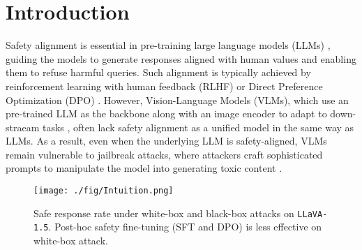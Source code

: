 \vspace{-0.5em}
\section{Introduction}
\vspace{-0.5em}




Safety alignment is essential in pre-training large language models (LLMs) \cite{bai2022training, ouyang2022training}, guiding the models to generate responses aligned with human values and enabling them to refuse harmful queries. Such alignment is typically achieved by reinforcement learning with human feedback (RLHF) \cite{ouyang2022training} or Direct Preference Optimization (DPO) \cite{dpo}. 
However, Vision-Language Models (VLMs), which use an pre-trained LLM as the backbone along with an image encoder to adapt to down-straeam tasks \cite{llava, llava-1.5, minigpt, instructblip, qwen}, often lack safety alignment as a unified model in the same way as LLMs. As a result, even when the underlying LLM is safety-aligned, VLMs remain vulnerable to jailbreak attacks, where attackers craft sophisticated prompts to manipulate the model into generating toxic content \cite{visual_adv, imgjp, figstep, mm-safetybench}. 





\begin{figure}[!ht]
    \centering
    \texttt{[image: ./fig/Intuition.png]}
    \setlength{\abovecaptionskip}{0.2cm}
    \vspace{-1em}
    \caption{Safe response rate under white-box and black-box attacks on \texttt{LLaVA-1.5}. Post-hoc safety fine-tuning (SFT and DPO) is less effective on white-box attack.} 
    \label{fig:intuition}
    \vspace{-1em}
\end{figure}

